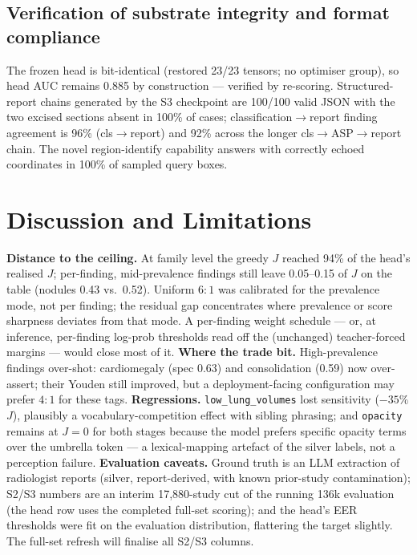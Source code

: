 \documentclass[10pt,a4paper]{article}
\begin{document}
\subsection{Verification of substrate integrity and format compliance}

The frozen head is bit-identical (restored 23/23 tensors; no optimiser group), so head
AUC remains 0.885 by construction --- verified by re-scoring. Structured-report chains
generated by the S3 checkpoint are 100/100 valid JSON with the two excised sections
absent in 100\% of cases; classification$\to$report finding agreement is 96\%
(cls$\to$report) and 92\% across the longer cls$\to$ASP$\to$report chain. The novel
region-identify capability answers with correctly echoed coordinates in 100\% of
sampled query boxes.

\section{Discussion and Limitations}

\textbf{Distance to the ceiling.} At family level the greedy $J$ reached 94\% of the
head's realised $J$; per-finding, mid-prevalence findings still leave 0.05--0.15 of $J$
on the table (nodules 0.43 vs.\ 0.52). Uniform $6{:}1$ was calibrated for the
prevalence mode, not per finding; the residual gap concentrates where prevalence or
score sharpness deviates from that mode. A per-finding weight schedule --- or, at
inference, per-finding log-prob thresholds read off the (unchanged) teacher-forced
margins --- would close most of it. \textbf{Where the trade bit.} High-prevalence
findings over-shot: cardiomegaly (spec 0.63) and consolidation (0.59) now over-assert;
their Youden still improved, but a deployment-facing configuration may prefer $4{:}1$
for these tags. \textbf{Regressions.} \texttt{low\_lung\_volumes} lost sensitivity
($-35\%$ $J$), plausibly a vocabulary-competition effect with sibling phrasing; and
\texttt{opacity} remains at $J{=}0$ for both stages because the model prefers specific
opacity terms over the umbrella token --- a lexical-mapping artefact of the silver
labels, not a perception failure. \textbf{Evaluation caveats.} Ground truth is an
LLM extraction of radiologist reports (silver, report-derived, with known prior-study
contamination); S2/S3 numbers are an interim 17{,}880-study cut of the running 136k
evaluation (the head row uses the completed full-set scoring); and the head's EER
thresholds were fit on the evaluation distribution, flattering the target slightly.
The full-set refresh will finalise all S2/S3 columns.
\end{document}
